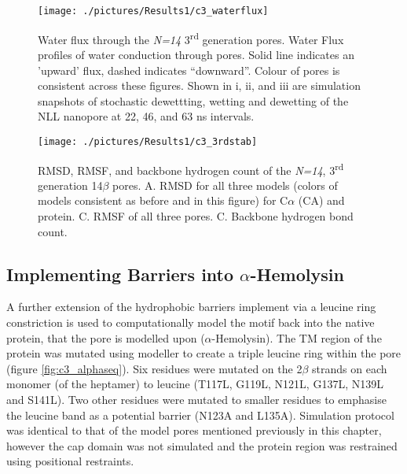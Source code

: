 \begin{figure}[H]
\begin{center}
\texttt{[image: ./pictures/Results1/c3\_waterflux]}
\caption[Water flux through the \textit{N=14} 3\textsuperscript{rd} generation pores.]{Water flux through the \textit{N=14} 3\textsuperscript{rd} generation pores. Water Flux profiles of water conduction through pores. Solid line indicates an 'upward' flux, dashed indicates ``downward''. Colour of pores is consistent across these figures. Shown in i, ii, and iii are simulation snapshots of stochastic dewettting, wetting and dewetting of the NLL nanopore at 22, 46, and 63 ns intervals.}
\label{fig:c3_waterflux}
\end{center}
\end{figure}

\begin{figure}[H]
\begin{center}
\texttt{[image: ./pictures/Results1/c3\_3rdstab]}
\caption[RMSD, RMSF, and backbone hydrogen bond count of the \textit{N=14}, 3\textsuperscript{rd} generation 14$\beta$ pores.] {RMSD, RMSF, and backbone hydrogen count of the \textit{N=14}, 3\textsuperscript{rd} generation 14$\beta$ pores. A. RMSD for all three models (colors of models consistent as before and in this figure) for C$\alpha$ (CA) and protein. C. RMSF of all three pores. C. Backbone hydrogen bond count.}
\label{fig:c3_3rdstab}
\end{center}
\end{figure}



\subsection{Implementing Barriers into $\alpha$-Hemolysin}

A further extension of the hydrophobic barriers implement via a leucine ring constriction is used to  computationally model the motif back into the native protein, that the pore is modelled upon ($\alpha$-Hemolysin). The TM region of the protein was mutated using modeller to create a triple leucine ring within the pore (figure \ref{fig:c3_alphaseq}). Six residues were mutated on the 2$\beta$ strands on each monomer (of the heptamer) to leucine (T117L, G119L, N121L, G137L, N139L and S141L). Two other residues were mutated to smaller residues to emphasise the leucine band as a potential barrier (N123A and L135A). Simulation protocol was identical to that of the model pores mentioned previously in this chapter, however the cap domain was not simulated and the protein region was restrained using positional restraints. 

